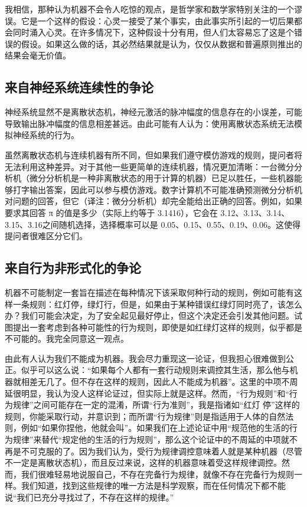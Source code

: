 \documentclass[12pt,a4paper,twoside]{article}
\begin{document}
我相信，那种认为机器不会令人吃惊的观点，是哲学家和数学家特别关注的一个谬误。它是一个这样的假设：心灵一接受了某个事实，由此事实所引起的一切后果都会同时涌入心灵。在许多情况下，这种假设十分有用，但人们太容易忘了这是个错误的假设。如果这么做的话，其必然结果就是认为，仅仅从数据和普遍原则推出的结果会毫无价值。

\subsection{来自神经系统连续性的争论}
神经系统显然不是离散状态机，神经元激活的脉冲幅度的信息存在的小误差，可能导致输出脉冲幅度的信息相差甚远。由此可能有人认为：使用离散状态系统无法模拟神经系统的行为。

虽然离散状态机与连续机器有所不同，但如果我们遵守模仿游戏的规则，提问者将无法利用这种差异。对于其他一些更简单的连续机器，情况更加清晰：一台微分分析机（微分分析机是一种非离散状态的用于计算的机器）已足以胜任，一些机器能够打字输出答案，因此可以参与模仿游戏。数字计算机不可能准确预测微分分析机对问题的回答，但它（译注：微分分析机）却完全能给出正确的回答。例如，如果要求其回答 π 的值是多少（实际上约等于 3.1416），它会在 3.12、3.13、3.14、3.15、3.16之间随机选择，选择概率可以是 0.05、0.15、0.55、0.19、0.06。这使得提问者很难区分它们。

\subsection{来自行为非形式化的争论}
机器不可能制定一套旨在描述在每种情况下该采取何种行动的规则，例如可能有这样一条规则：红灯停，绿灯行，但是，如果由于某种错误红绿灯同时亮了，该怎么办？我们可能会决定，为了安全起见最好停止，但这个决定还会引发其他问题。试图提出一套考虑到各种可能性的行为规则，即使是如红绿灯这样的规则，似乎都是不可能的。我完全同意这一观点。

由此有人认为我们不能成为机器。我会尽力重现这一论证，但我担心很难做到公正。似乎可以这么说：“如果每个人都有一套行动规则来调控其生活，那么他与机器就相差无几了。但不存在这样的规则，因此人不能成为机器”。这里的中项不周延很明显，我认为没人这样论证过，但实际上就是这样。然而，“行为规则”和“行为规律”之间可能存在一定的混淆，所谓“行为准则”，我是指诸如“红灯 停”这样的规则，你能采取行动，并意识到；而所谓“行为规律”则是指适用于人体的自然法则，例如“如果你捏他，他就会叫”。如果我们在上述论证中用“规范他的生活的行为规律”来替代“规定他的生活的行为规则”，那么这个论证中的不周延的中项就不再是不可克服的了。因为我们认为，受行为规律调控意味着人就是某种机器（尽管不一定是离散状态机），而且反过来说，这样的机器意味着受这样规律调控。然而，我们很难轻易地说服自己，不存在完备行为规律，就像不存在完备行为规则一样。我们知道，找到这些规律的唯一方法是科学观察，而在任何情况下都不能说“我们已充分寻找过了，不存在这样的规律。”
\end{document}
